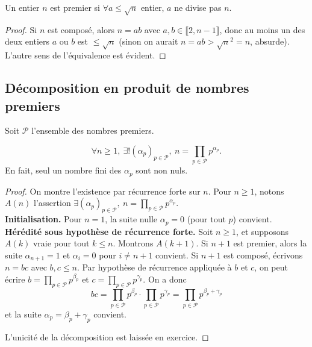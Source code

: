 \begin{proposition}
Un entier $n$ est premier si $\forall a \leq \sqrt n$ entier, $a$ ne divise pas $n$.
\end{proposition}
\begin{proof}
Si $n$ est composé, alors $n=ab$ avec $a, b \in \llbracket 2,n-1 \rrbracket$, donc au moins un des deux entiers $a$ ou $b$ est $\leq\sqrt n$ (sinon on aurait $n=ab > \sqrt{n}^2=n$, absurde). L'autre sens de l'équivalence est évident.
\end{proof}



\subsection{Décomposition en produit de nombres premiers}
Soit $\mathcal P$ l'ensemble des nombres premiers.

\begin{proposition}
\[
\forall n\geq 1, \: \exists !  (\alpha_p)_{p\in \mathcal P}, \: n = \prod_{p\in \mathcal P} p^{\alpha_p}.
\]
En fait, seul un nombre fini des $\alpha_p$ sont non nuls.
\end{proposition}
\begin{proof}
On montre l'existence par récurrence forte sur $n$. Pour $n\geq 1$, notons $A(n)$ l'assertion  $\exists  (\alpha_p)_{p\in \mathcal P}, \: n = \prod_{p\in \mathcal P} p^{\alpha_p}$.\\

\textbf{Initialisation.} Pour $n=1$, la suite nulle $\alpha_p = 0$ (pour tout $p$) convient.\\

\textbf{Hérédité sous hypothèse de récurrence forte.} Soit $n\geq 1$, et supposons $A(k)$ vraie pour tout $k\leq n$. Montrons $A(k+1)$. Si $n+1$ est premier, alors la suite $\alpha_{n+1}=1$ et $\alpha_i=0$ pour $i\neq n+1$ convient. Si $n+1$ est composé, écrivons $n=bc$ avec $b,c\leq n$. Par hypothèse de récurrence appliquée à $b$ et $c$, on peut écrire $b=\prod_{p\in \mathcal P} p^{\beta_p}$ et $c=\prod_{p\in \mathcal P} p^{\gamma_p}$. On a donc 
\[ bc = \prod_{p\in \mathcal P} p^{\beta_p} \cdot \prod_{p\in \mathcal P} p^{\gamma_p}
= \prod_{p\in \mathcal P} p^{\beta_p+\gamma_p}\] et la suite $\alpha_p = \beta_p+\gamma_p$ convient.

L'unicité de la décomposition est laissée en exercice.
\end{proof}

